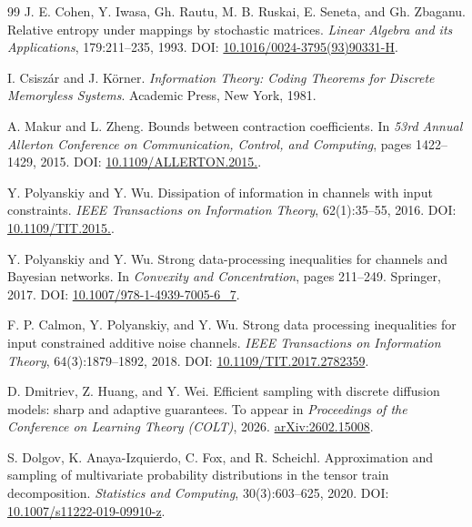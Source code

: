 \documentclass[a4paper,11pt]{article}
\theoremstyle{definition}
\newcommand{\1}{\mathbf 1}
\begin{document}
\begin{thebibliography}{99}
J. E. Cohen, Y. Iwasa, Gh. Rautu, M. B. Ruskai, E. Seneta, and Gh. Zbaganu.
\newblock Relative entropy under mappings by stochastic matrices.
\newblock \emph{Linear Algebra and its Applications}, 179:211--235, 1993.
\newblock DOI: \href{https://doi.org/10.1016/0024-3795(93)90331-H}
{10.1016/0024-3795(93)90331-H}.

I. Csisz\'ar and J. K\"orner.
\newblock \emph{Information Theory: Coding Theorems for Discrete Memoryless
Systems}.
\newblock Academic Press, New York, 1981.

A. Makur and L. Zheng.
\newblock Bounds between contraction coefficients.
\newblock In \emph{53rd Annual Allerton Conference on Communication, Control,
and Computing}, pages 1422--1429, 2015.
\newblock DOI: \href{https://doi.org/10.1109/ALLERTON.2015.7447178}
{10.1109/\allowbreak ALLERTON.2015.}.

Y. Polyanskiy and Y. Wu.
\newblock Dissipation of information in channels with input constraints.
\newblock \emph{IEEE Transactions on Information Theory}, 62(1):35--55, 2016.
\newblock DOI: \href{https://doi.org/10.1109/TIT.2015.2482978}
{10.1109/\allowbreak TIT.2015.}.

Y. Polyanskiy and Y. Wu.
\newblock Strong data-processing inequalities for channels and Bayesian networks.
\newblock In \emph{Convexity and Concentration}, pages 211--249. Springer, 2017.
\newblock DOI: \href{https://doi.org/10.1007/978-1-4939-7005-6_7}
{10.1007/978-1-4939-7005-6\_7}.

F. P. Calmon, Y. Polyanskiy, and Y. Wu.
\newblock Strong data processing inequalities for input constrained additive noise channels.
\newblock \emph{IEEE Transactions on Information Theory}, 64(3):1879--1892, 2018.
\newblock DOI: \href{https://doi.org/10.1109/TIT.2017.2782359}
{10.1109/TIT.2017.2782359}.

D. Dmitriev, Z. Huang, and Y. Wei.
\newblock Efficient sampling with discrete diffusion models: sharp and
adaptive guarantees.
\newblock To appear in {\em Proceedings of the Conference on Learning Theory
(COLT)}, 2026.
\newblock \href{https://arxiv.org/abs/2602.15008}{arXiv:2602.15008}.

S. Dolgov, K. Anaya-Izquierdo, C. Fox, and R. Scheichl.
\newblock Approximation and sampling of multivariate probability
distributions in the tensor train decomposition.
\newblock \emph{Statistics and Computing}, 30(3):603--625, 2020.
\newblock DOI: \href{https://doi.org/10.1007/s11222-019-09910-z}
{10.1007/s11222-019-09910-z}.


\end{thebibliography}
\end{document}
